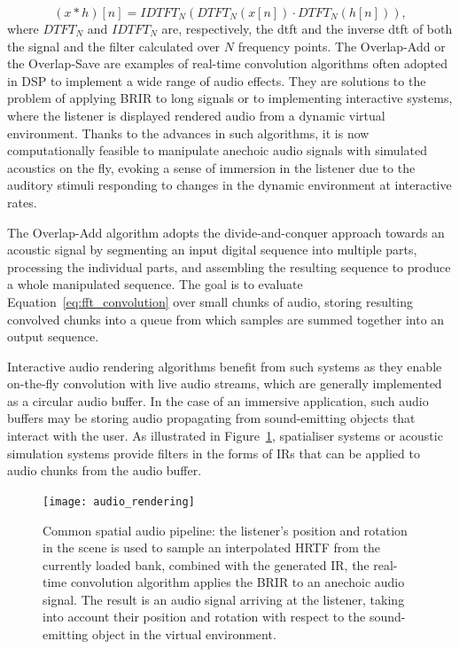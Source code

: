 \begin{equation}
    (x * h)[n] = IDTFT_N( DTFT_N(x[n]) \cdot DTFT_N(h[n]) ),
    \label{eq:fft_convolution}
\end{equation}
where $DTFT_N$ and $IDTFT_N$ are, respectively, the \acrshort{dtft} and the inverse \acrshort{dtft} of both the signal and the filter calculated over $N$ frequency points.
The Overlap-Add or the Overlap-Save are examples of real-time convolution algorithms often adopted in DSP to implement a wide range of audio effects. They are solutions to the problem of applying BRIR to long signals or to implementing interactive systems, where the listener is displayed rendered audio from a dynamic virtual environment. Thanks to the advances in such algorithms, it is now computationally feasible to manipulate anechoic audio signals with simulated acoustics on the fly, evoking a sense of immersion in the listener due to the auditory stimuli responding to changes in the dynamic environment at interactive rates. \par
The Overlap-Add algorithm adopts the divide-and-conquer approach towards an acoustic signal by segmenting an input digital sequence into multiple parts, processing the individual parts, and assembling the resulting sequence to produce a whole manipulated sequence. The goal is to evaluate Equation~\ref{eq:fft_convolution} over small chunks of audio, storing resulting convolved chunks into a queue from which samples are summed together into an output sequence. \par
Interactive audio rendering algorithms benefit from such systems as they enable on-the-fly convolution with live audio streams, which are generally implemented as a circular audio buffer. In the case of an immersive application, such audio buffers may be storing audio propagating from sound-emitting objects that interact with the user. As illustrated in Figure~\ref{fig:audio_rendering_chain}, spatialiser systems or acoustic simulation systems provide filters in the forms of IRs that can be applied to audio chunks from the audio buffer.
\begin{figure}
    \centering
    \texttt{[image: audio\_rendering]}
    \caption[Standard audio rendering pipeline]{Common spatial audio pipeline: the listener's position and rotation in the scene is used to sample an interpolated HRTF from the currently loaded bank, combined with the generated IR, the real-time convolution algorithm applies the BRIR to an anechoic audio signal. The result is an audio signal arriving at the listener, taking into account their position and rotation with respect to the sound-emitting object in the virtual environment.}
    \label{fig:audio_rendering_chain}
\end{figure}

